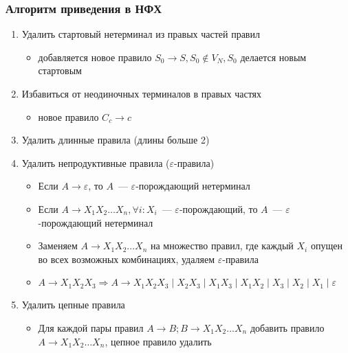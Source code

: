 \documentclass{beamer}
\begin{document}
\begin{frame}[fragile]
  \transwipe[direction=90]
  \frametitle{Алгоритм приведения в НФХ}

  \begin{enumerate}
    \item Удалить стартовый нетерминал из правых частей правил
    \begin{itemize}
      \item добавляется новое правило $S_0 \to S, S_0 \notin V_N, S_0$ делается новым стартовым
    \end{itemize}
    \item Избавиться от неодиночных терминалов в правых частях
    \begin{itemize}
      \item новое правило $C_c \to c$
    \end{itemize}
    \item Удалить длинные правила (длины больше 2)
    \item Удалить непродуктивные правила ($\varepsilon$-правила)
    \begin{itemize}
      \item Если $A \to \varepsilon$, то $A$~--- $\varepsilon$-порождающий нетерминал
      \item Если $A \to X_1 X_2 \dots X_n, \forall i: X_i$~--- $\varepsilon$-порождающий, то $A$~--- $\varepsilon$-порождающий нетерминал
      \item Заменяем $A \to X_1 X_2 \dots X_n$ на множество правил, где каждый $X_i$ опущен во всех возможных комбинациях, удаляем $\varepsilon$-правила
      \item $A \to X_1 X_2 X_3 \Rightarrow A \to X_1 X_2 X_3 \mid X_2 X_3 \mid X_1 X_3 \mid X_1 X_2 \mid X_3 \mid X_2 \mid X_1 \mid \varepsilon$
    \end{itemize}
    \item Удалить цепные правила
    \begin{itemize}
      \item Для каждой пары правил $A \to B; B \to  X_1 X_2 \dots X_n$ добавить правило $A \to  X_1 X_2 \dots X_n$, цепное правило удалить
    \end{itemize}
  \end{enumerate}
\end{frame}
\end{document}

